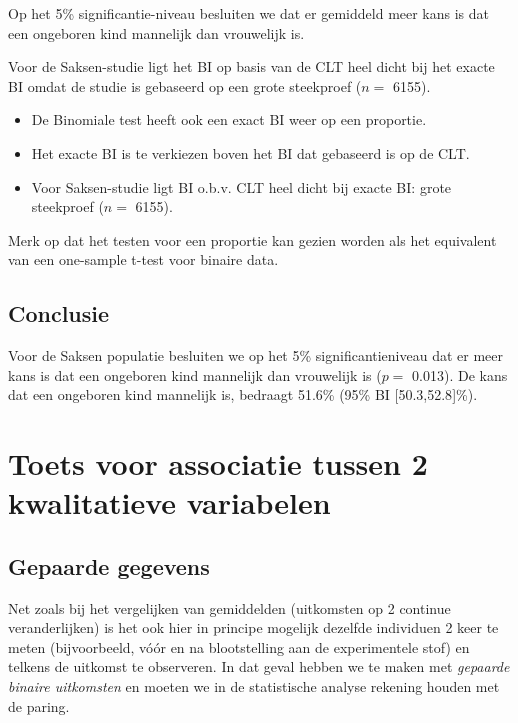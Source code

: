 \documentclass[
  12pt,dutch,coursenotes]{book}
\begin{document}
Op het 5\% significantie-niveau besluiten we dat er gemiddeld meer kans is dat een ongeboren kind mannelijk dan vrouwelijk is.

Voor de Saksen-studie ligt het BI op basis van de CLT heel dicht bij het exacte BI omdat de studie is gebaseerd op een grote steekproef (\(n=\) 6155).

\begin{itemize}
\item
  De Binomiale test heeft ook een exact BI weer op een proportie.
\item
  Het exacte BI is te verkiezen boven het BI dat gebaseerd is op de CLT.
\item
  Voor Saksen-studie ligt BI o.b.v. CLT heel dicht bij exacte BI: grote steekproef (\(n=\) 6155).
\end{itemize}

Merk op dat het testen voor een proportie kan gezien worden als het equivalent van een one-sample t-test voor binaire data.

\hypertarget{conclusie}{%
\subsection{Conclusie}\label{conclusie}}

Voor de Saksen populatie besluiten we op het 5\% significantieniveau dat er meer kans is dat een ongeboren kind mannelijk dan vrouwelijk is (\(p=\) 0.013).
De kans dat een ongeboren kind mannelijk is, bedraagt 51.6\% (95\% BI {[}50.3,52.8{]}\%).

\hypertarget{toets-voor-associatie-tussen-2-kwalitatieve-variabelen}{%
\section{Toets voor associatie tussen 2 kwalitatieve variabelen}\label{toets-voor-associatie-tussen-2-kwalitatieve-variabelen}}

\hypertarget{gepaarde-gegevens}{%
\subsection{Gepaarde gegevens}\label{gepaarde-gegevens}}

Net zoals bij het vergelijken van
gemiddelden (uitkomsten op 2 continue veranderlijken) is het ook hier in
principe mogelijk dezelfde individuen 2 keer te meten (bijvoorbeeld,
vóór en na blootstelling aan de experimentele stof) en telkens de
uitkomst te observeren. In dat geval hebben we te maken met \emph{gepaarde
binaire uitkomsten} en moeten we in de statistische analyse rekening houden
met de paring.
\end{document}
